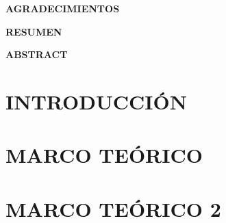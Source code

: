 \documentclass[12pt,openany]{report}
\begin{document}
    
	\setcounter{page}{2} %
	\begin{center}
		 \label{glads}
		\large{\textbf{AGRADECIMIENTOS}}
	\end{center}
	
	\clearpage
    \begin{center}
		 \label{resumen}
		\large{\textbf{RESUMEN}}
	\end{center}
	
	\clearpage
    \begin{center}
		 \label{abstract}
		\large{\textbf{ABSTRACT}}
	\end{center}
	
	\clearpage
	\renewcommand{\cfttoctitlefont}{\large}
	\renewcommand{\contentsname}{\textbf{TABLA DE CONTENIDOS}}
	\tableofcontents 
	\newpage
	\renewcommand\cftloftitlefont{\large}
	\renewcommand{\listfigurename}{\textbf{ÍNDICE DE FIGURAS}}
	{%
		\let\oldnumberline\numberline%
		\renewcommand{\numberline}{\figurename~\oldnumberline}%
		\listoffigures%
	}
	\newpage
	\renewcommand\cftlottitlefont{\large}
	\renewcommand{\listtablename}{\textbf{ÍNDICE DE TABLAS}}
	{%
		\let\oldnumberline\numberline%
		\renewcommand{\numberline}{\tablename~\oldnumberline}%
		\listoftables%
	}
	\newpage
	\setcounter{page}{1} %
	\chapternumberfont{\huge}
	\chaptertitlefont{\large}
	\chapter{INTRODUCCIÓN} \label{intr}
	
	\chapter{MARCO TEÓRICO} \label{cap2}
	
	\chapter{MARCO TEÓRICO 2} \label{cap3}
	
\end{document}
